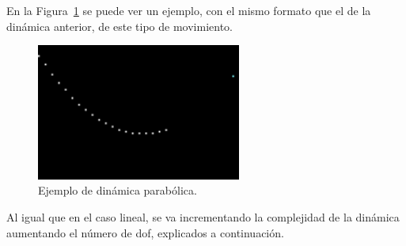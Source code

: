En la Figura~\ref{fig.parab} se puede ver un ejemplo, con el mismo formato que el de la dinámica anterior, de este tipo de movimiento.

\begin{figure}[H]
		\begin{center}
			\includegraphics[width=0.6\textwidth]{Memoria-TFM/figures/samples/parabolic_sample.png}
			\caption{Ejemplo de dinámica parabólica.}
			\label{fig.parab}
		\end{center}
\end{figure}
\vspace{-10pt}

Al igual que en el caso lineal, se va incrementando la complejidad de la dinámica  aumentando el número de \acrshort{dof}, explicados a continuación.

